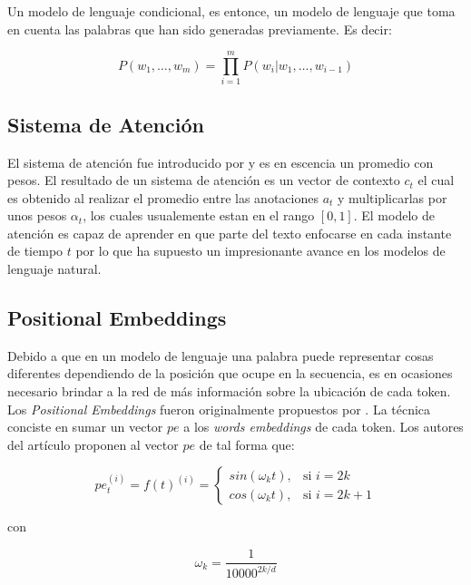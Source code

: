 	Un modelo de lenguaje condicional, es entonce, un modelo de lenguaje que toma en cuenta las palabras que han sido generadas previamente. Es decir:

	\begin{equation}
		P(w_{1}, \dots, w_{m}) = \prod_{i = 1}^{m} P(w_{i}|w_{1}, \dots, w_{i-1})
	\end{equation}

	\subsection{Sistema de Atención}

	El sistema de atención fue introducido por \cite{bahdanau2014neural} y es en escencia un promedio con pesos. El resultado de un sistema de atención es un vector de contexto $c_{t}$ el cual es obtenido al realizar el promedio entre las anotaciones $a_{t}$ y multiplicarlas por unos pesos $\alpha_{t}$, los cuales usualemente estan en el rango $[0,1]$. El modelo de atención es capaz de aprender en que parte del texto enfocarse en cada instante de tiempo $t$ por lo que ha supuesto un impresionante avance en los modelos de lenguaje natural.

	\subsection{Positional Embeddings}

	Debido a que en un modelo de lenguaje una palabra puede representar cosas diferentes dependiendo de la posición que ocupe en la secuencia, es en ocasiones necesario brindar a la red de más información sobre la ubicación de cada token. Los \textit{Positional Embeddings} fueron originalmente propuestos por \cite{attentionisallyouneed}. La técnica conciste en sumar un vector $pe$ a los \textit{words embeddings} de cada token. Los autores del artículo proponen al vector $pe$ de tal forma que:

	\begin{equation}
		pe_{t}^{(i)} = f(t)^{(i)} = \left\{
										\begin{array}{ll}
											sin(\omega_{k}t), & \mbox{si } i = 2k \\
											cos(\omega_{k}t), & \mbox{si } i = 2k + 1
										\end{array}
									\right.
	\end{equation}

	con

	\begin{equation}
		\omega_{k} = \frac{1}{10000^{2k/d}}
	\end{equation}

